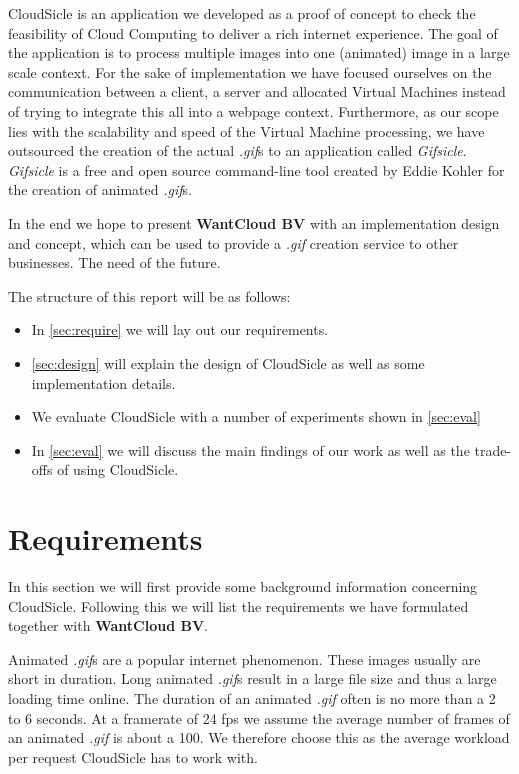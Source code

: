 \documentclass[twocolumn,twoside]{IEEEtran}
\begin{document}
CloudSicle is an application we developed as a proof of concept to 
check the feasibility of Cloud Computing to deliver a rich internet experience.
The goal of the application is to process multiple images into one (animated) image in a large scale context. For the sake of implementation
we have focused ourselves on the communication between a client,
a server and allocated Virtual Machines instead of trying to integrate this all into a 
webpage context. Furthermore, as our scope lies with the scalability
and speed of the Virtual Machine processing, we have outsourced the
creation of the actual \textit{.gif}s to an application called \textit{Gifsicle}\cite{gifsicle}.
\textit{Gifsicle} is a free and open source command-line tool created
by Eddie Kohler for the creation of animated \textit{.gif}s.

In the end we hope to present \textbf{WantCloud BV} with an implementation
design and concept, which can be used to provide a \textit{.gif}
creation service to other businesses. The need of the future.

The structure of this report will be as follows:
\begin{itemize}
\item In \autoref{sec:require} we will lay out our requirements.
\item \autoref{sec:design} will explain the design of CloudSicle as well as some implementation details.
\item We evaluate CloudSicle with a number of experiments shown in \autoref{sec:eval}
\item In \autoref{sec:eval} we will discuss the main findings of our work as well as the trade-offs of using CloudSicle.
\end{itemize}

\section{Requirements}
\label{sec:require}
In this section we will first provide some background information concerning CloudSicle. Following this we will list the requirements we have formulated  together with \textbf{WantCloud BV}.

Animated \textit{.gif}s are a popular internet phenomenon. These images usually are short in duration. Long animated \textit{.gif}s result in a large file size and thus a large loading time online. The duration of an animated \textit{.gif} often is no more than a 2 to 6 seconds. At a framerate of 24 fps we assume the average number of frames of an animated \textit{.gif} is about a 100. We therefore choose this as the average workload per request CloudSicle has to work with.
\end{document}
